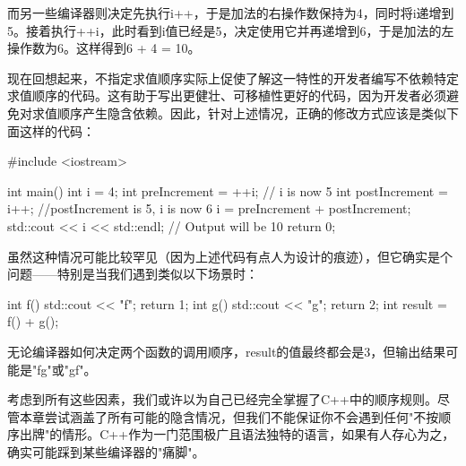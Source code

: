 而另一些编译器则决定先执行i++，于是加法的右操作数保持为4，同时将i递增到5。接着执行++i，此时看到i值已经是5，决定使用它并再递增到6，于是加法的左操作数为6。这样得到6 + 4 = 10。

现在回想起来，不指定求值顺序实际上促使了解这一特性的开发者编写不依赖特定求值顺序的代码。这有助于写出更健壮、可移植性更好的代码，因为开发者必须避免对求值顺序产生隐含依赖。因此，针对上述情况，正确的修改方式应该是类似下面这样的代码：

\begin{cpp}
#include <iostream>

int main() {
  int i = 4;
  int preIncrement = ++i; // i is now 5
  int postIncrement = i++; //postIncrement is 5, i is now 6
  i = preIncrement + postIncrement;
  std::cout << i << std::endl; // Output will be 10
  return 0;
}
\end{cpp}

虽然这种情况可能比较罕见（因为上述代码有点人为设计的痕迹），但它确实是个问题——特别是当我们遇到类似以下场景时：

\begin{cpp}
int f() { std::cout << "f"; return 1; }
int g() { std::cout << "g"; return 2; }
int result = f() + g();
\end{cpp}

无论编译器如何决定两个函数的调用顺序，result的值最终都会是3，但输出结果可能是"fg"或"gf"。

考虑到所有这些因素，我们或许以为自己已经完全掌握了C++中的顺序规则。尽管本章尝试涵盖了所有可能的隐含情况，但我们不能保证你不会遇到任何"不按顺序出牌"的情形。C++作为一门范围极广且语法独特的语言，如果有人存心为之，确实可能踩到某些编译器的"痛脚"。

